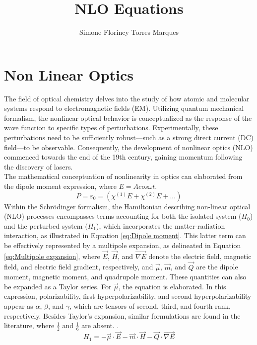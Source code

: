 \documentclass{article}
\title{NLO Equations}
\author{Simone Florincy Torres Marques}
\begin{document}
	
	\maketitle
	

	\section{Non Linear Optics}
		\qquad The field of optical chemistry delves into the study of how atomic and molecular systems respond to electromagnetic fields (EM). Utilizing quantum mechanical formalism, the nonlinear optical behavior is conceptualized as the response of the wave function to specific types of perturbations. Experimentally, these perturbations need to be sufficiently robust—such as a strong direct current (DC) field—to be observable. Consequently, the development of nonlinear optics (NLO) commenced towards the end of the 19th century, gaining momentum following the discovery of lasers. \\
		\qquad The mathematical conceptuation of nonlinearity in optics can elaborated from the dipole moment expression, where $E=Acos\omega t$.
		\begin{equation}\label{eq:Dipole moment}
		P=\varepsilon_0 =(\chi^{(1)}E+\chi^{(2)}E+...)
		\end{equation}
		\qquad Within the Schrödinger formalism, the Hamiltonian describing non-linear optical (NLO) processes encompasses terms accounting for both the isolated system ($H_{0}$) and the perturbed system ($H_{1}$), which incorporates the matter-radiation interaction, as illustrated in Equation \ref{eq:Dipole moment}. This latter term can be effectively represented by a multipole expansion, as delineated in Equation \ref{eq:Multipole expansion}, where $\vec{E}$, $\vec{H}$, and $\vec{\nabla E}$ denote the electric field, magnetic field, and electric field gradient, respectively, and $\vec{\mu}$, $\vec{m}$, and $\vec{Q}$ are the dipole moment, magnetic moment, and quadrupole moment. These quantities can also be expanded as a Taylor series. For $\vec{\mu}$, the equation is elaborated. In this expression, polarizability, first hyperpolarizability, and second hyperpolarizability appear as $\alpha$, $\beta$, and $\gamma$, which are tensors of second, third, and fourth rank, respectively. Besides Taylor's expansion, similar formulations are found in the literature, where $\frac{1}{2}$ and $\frac{1}{6}$ are absent.
.		\begin{equation}\label{eq:Multipole expansion}
		H_{1}=-\vec{\mu}\cdot \vec{E}-\vec{m}\cdot \vec{H}-\vec{Q}\cdot \vec{\nabla E}
		\end{equation}
\end{document}
